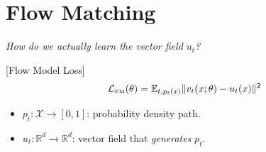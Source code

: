 \documentclass{beamer}
\begin{document}
\section{Flow Matching}
\begin{frame}
    \begin{center}
        \emph{How do we actually learn the vector field \( u_t \)?}
    \end{center}
\end{frame}
\begin{frame}
    [Flow Model Loss]{
        \[ \mathcal{L}_{\text{\tiny FM}}(\theta) = \mathbb{E}_{t, p_t(x)} \|v_{t}(x; \theta) - u_t(x)\|^2 \]
    }
   \begin{itemize}
        \item \( p_t : \mathcal{X} \to [0, 1] \): probability density path.
        \item \( u_t : \mathbb{R}^d \to \mathbb{R}^d \): vector field that \emph{generates} \( p_t \).
    \end{itemize}
    \vspace*{.5cm}
\end{frame}
\end{document}
